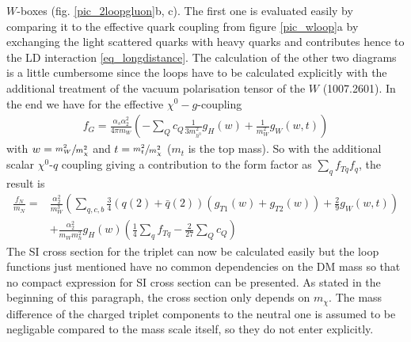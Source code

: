 $W$-boxes (fig. \ref{pic_2loopgluon}b, c). The first one is evaluated easily by comparing it to the effective quark coupling from figure \ref{pic_wloop}a
by exchanging the light scattered quarks with heavy quarks and contributes hence to the LD interaction \eqref{eq_longdistance}. The calculation of 
the other two diagrams is a little cumbersome since the loops have to be calculated explicitly with the additional treatment of the vacuum polarisation
tensor of the $W$ (1007.2601). In the end we have for the effective $\chi^0-g$-coupling
\begin{align}
 f_G = \frac{\alpha_s\alpha_2^2}{4\pi m_W}\left(-\sum\limits_Q c_Q \frac{1}{3m_{h^0}^2} g_H(w) + \frac{1}{m_W^2} g_{W}(w,t) \right)
\end{align}
with $w=\sfrac{m_W^2}{m_\chi^2}$ and $t=\sfrac{m_t^2}{m_\chi^2}$ ($m_t$ is the top mass).
So with the additional scalar $\chi^0$-$q$ coupling giving a contribution to the form factor as $\sum_qf_{Tq}f_q$, the result is
\begin{align}
 \frac{f_N}{m_N} =& \frac{\alpha_2^2}{m_W^3}\left(\sum\limits_{q,c,b} \frac34 \left(q(2)+\bar q(2)\right) \left(g_{T1}(w) + g_{T2}(w)\right) + \frac29g_W(w,t)\right) \\
 \nonumber
 &+ \frac{\alpha_2^2}{m_W m_h^2}g_H(w) \left(\frac14 \sum\limits_q f_{Tq} - \frac{2}{27}\sum\limits_Q c_Q \right)
\end{align}
The SI cross section for the triplet can now be calculated easily but the loop functions just mentioned have no common dependencies on the DM mass
so that no compact expression for SI cross section can be presented. As stated in the beginning of this paragraph, the cross section only depends
on $m_\chi$. The mass difference of the charged triplet components to the neutral one is assumed to be negligable compared to the mass scale itself,
so they do not enter explicitly. 












